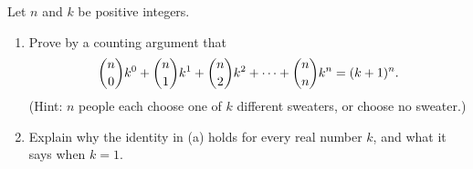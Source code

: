 Let $n$ and $k$ be positive integers.
\begin{enumerate}
\item[(a)] Prove by a counting argument that
\[\dbinom n0k^0+\dbinom n1k^1+\dbinom n2k^2+\cdots+\dbinom nnk^n=(k+1)^n.\]
(Hint: $n$ people each choose one of $k$ different sweaters, or choose no sweater.)
\item[(b)] Explain why the identity in (a) holds for every real number $k$, and what it says when $k=1$.
\end{enumerate}

